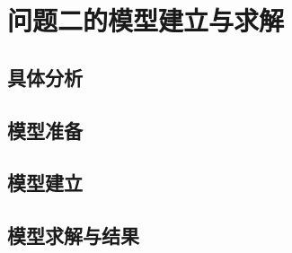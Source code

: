\clearpage
\section{问题二的模型建立与求解}
\subsection{具体分析}
\subsection{模型准备}
\subsection{模型建立}
\subsection{模型求解与结果}
